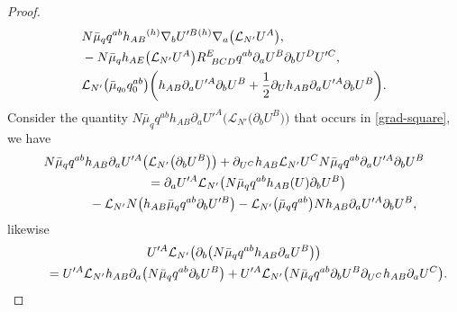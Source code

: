 \documentclass[11pt]{article}
\numberwithin{equation}{section}
\def\ptl{\partial}%
\def\grad{{\nabla}}%
\newcommand{\leftexp}[2]{{\vphantom{#2}}^{#1}{#2}}
\def\halb{\frac{1}{2}}%
\numberwithin{equation}{section}
\begin{document}
\begin{proof}
\begin{align}
&N \bar{\mu}_q q^{ab} h_{AB} \leftexp{(h)}{\grad}_b U'^B \leftexp{(h)}{\grad}_a \bigl(\mathcal{L}_{N'} U^A\bigr),\nonumber\\
&- N \bar{\mu}_q h_{AE} \bigl(\mathcal{L}_{N'} U^A\bigr) R^E_{\,\,\,BCD} q^{ab} \ptl_a U^B \ptl_b U^D U'^C, \nonumber\\
& \mathcal{L}_{N'} \bigl(\bar{\mu}_{q_0} q^{ab}_0\bigr) \biggl(h_{AB} \ptl_a U'^A \ptl_b U^B + \halb \ptl_{U}h_{AB} \ptl_a U'^A \ptl_b U^B\biggr).\label{grad-square}
\end{align}
Consider the quantity $N \bar{\mu}_q q^{ab} h_{AB} \ptl_a U'^A \bigl(\mathcal{L}_{N'}\bigl(\ptl_b U^B\bigr)\bigr)$ that occurs in \eqref{grad-square}, we have
\begin{gather*}
N \bar{\mu}_q q^{ab} h_{AB} \ptl_a U'^A \bigl(\mathcal{L}_{N'}\bigl(\ptl_b U^B\bigr)\bigr) + \ptl_{U^C} h_{AB} \mathcal{L}_{N'} U^C N \bar{\mu}_qq^{ab}\ptl_a U'^A \ptl_b U^B \notag\\
\qquad{}= \ptl_a U'^A \mathcal{L}_{N'} \bigl(N \bar{\mu}_q q^{ab} h_{AB}(U) \ptl_b U^B\bigr) \notag\\
\quad\qquad{} -\mathcal{L}_{N'} N \bigl(h_{AB} \bar{\mu}_q q^{ab} \ptl_b U'^B\bigr) - \mathcal{L}_{N'} \bigl(\bar{\mu}_q q^{ab}\bigr) N h_{AB} \ptl_a U'^A\ptl_b U^B,
\end{gather*}
likewise
\begin{gather*}
 U'^A \mathcal{L}_{N'} \bigl(\ptl_b \bigl(N \bar{\mu}_q q^{ab} h_{AB} \ptl_a U^B\bigr) \bigr) \notag\\
\qquad{}= U'^A \mathcal{L}_{N'} h_{AB}\ptl_a \bigl(N \bar{\mu}_q q^{ab} \ptl_b U^B\bigr) + U'^A \mathcal{L}_{N'} \bigl(N \bar{\mu}_q q^{ab} \ptl_b U^B \ptl_{U^C} h_{AB} \ptl_a U^C\bigr).
\end{gather*}


\end{proof}
\end{document}
